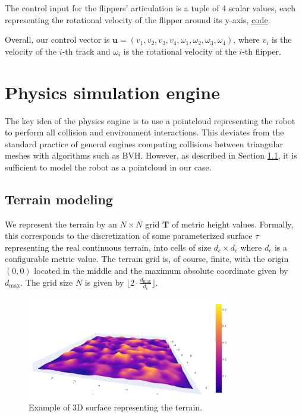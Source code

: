 \documentclass[a4paper,12pt]{article}
\begin{document}
The control input for the flippers' articulation is a tuple of 4 scalar values, each representing the rotational velocity of the flipper around its y-axis, \href{https://github.com/edavidk7/tracked_sim_rl/blob/main/engine/engine.py#L92}{code}.

Overall, our control vector is $\mathbf{u} = \left(v_1, v_2, v_3, v_4, \omega_1, \omega_2, \omega_3, \omega_4\right)$, where $v_i$ is the velocity of the $i$-th track and $\omega_i$ is the rotational velocity of the $i$-th flipper.

\section{Physics simulation engine}
\label{sec:engine}

The key idea of the physics engine is to use a pointcloud representing the robot to perform all collision and environment interactions. This deviates from the standard practice of general engines computing collisions between triangular meshes with algorithms such as BVH. However, as described in Section \ref{sec:terrain}, it is sufficient to model the robot as a pointcloud in our case.



\subsection{Terrain modeling}
\label{sec:terrain}
We represent the terrain by an $N \times N$ grid $\mathbf{T}$ of metric height values. Formally, this corresponds to the discretization of some parameterized surface $\tau$ representing the real continuous terrain, into cells of size $d_c \times d_c$ where $d_c$ is a configurable metric value. The terrain grid is, of course, finite, with the origin $(0,0)$ located in the middle and the maximum absolute coordinate given by $d_{\text{max}}$. The grid size $N$ is given by $\lfloor {2\cdot \frac{d_{\text{max}}}{d_c}} \rfloor$.

\begin{figure}[H]
  \centering
  \includegraphics[width=0.8\textwidth]{fig/terrain.png}
  \caption{Example of 3D surface representing the terrain.}
  \label{fig:terrain}
\end{figure}
\end{document}
